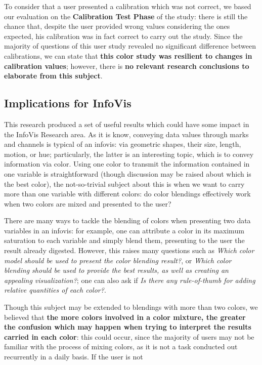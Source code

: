 %
To consider that a user presented a calibration which was not correct, we based our evaluation on the \textbf{Calibration Test Phase} of the
study: there is still the chance that, despite the user provided wrong values considering the ones expected, his calibration was in fact
correct to carry out the study. Since the majority of questions of this user study revealed no significant difference between calibrations,
we can state that \textbf{this color study was resilient to changes in calibration values}; however, there is \textbf{no relevant research
conclusions to elaborate from this subject}.
%
\subsection{Implications for InfoVis}
\label{subsec:results_discussion_infovis}
%
This research produced a set of useful results which could have some impact in the \gls{InfoVis} Research area. As it is know,
conveying data values through marks and channels is typical of an infovis: via geometric shapes, their size, length, motion, or hue;
particularly, the latter is an interesting topic, which is to convey information via color. Using one color to transmit the information
contained in one variable is straightforward (though discussion may be raised about which is the best color), the not-so-trivial subject about
this is when we want to carry more than one variable with different colors: do color blendings effectively work when two colors are mixed and
presented to the user? \par
%
There are many ways to tackle the blending of colors when presenting two data variables in an infovis: for example, one can attribute a color
in its maximum saturation to each variable and simply blend them, presenting to the user the result already digested. However, this raises
many questions such as \emph{Which color model should be used to present the color blending result?}, or \emph{Which color blending should be
used to provide the best results, as well as creating an appealing visualization?}; one can also ask if \emph{Is there any rule-of-thumb for
adding relative quantities of each color?}. \par
%
Though this subject may be extended to blendings with more than two colors, we believed that \textbf{the more colors involved in a color mixture,
the greater the confusion which may happen when trying to interpret the results carried in each color}: this could occur, since the majority of
users may not be familiar with the process of mixing colors, as it is not a task conducted out recurrently in a daily basis. If the user is not
